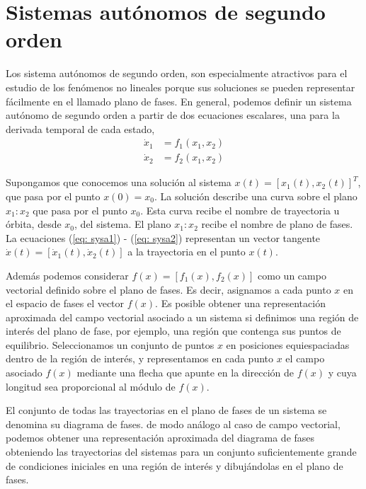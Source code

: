 \section{Sistemas autónomos de segundo orden}
Los sistema autónomos de segundo orden, son especialmente atractivos para el estudio de los fenómenos no lineales porque sus soluciones se pueden representar fácilmente en el llamado plano de fases.
En general, podemos definir un sistema autónomo de segundo orden a partir de dos ecuaciones escalares, una para la derivada temporal de cada estado,
\begin{align}
\dot x_1 &= f_1(x_1,x_2) \label{eq: sysa1}\\
\dot x_2 &= f_2(x_1,x_2) \label{eq: sysa2}
\end{align}

Supongamos que conocemos una solución al sistema $x(t) = [x_1(t),x_2(t)]^T$, que pasa por el punto $x(0) = x_0$. La solución describe una curva sobre el plano $x_1:x_2$ que pasa por el punto $x_0$. Esta curva recibe el nombre de trayectoria u órbita, desde $x_0$, del sistema. El plano $x_1:x_2$ recibe el nombre de plano de fases. La ecuaciones (\ref{eq: sysa1}) - (\ref{eq: sysa2}) representan un vector tangente $\dot x(t) = [\dot x_1(t),\dot x_2(t)]$ a la trayectoria en el punto $x(t)$.

Además podemos considerar $f(x)=[f_1(x),f_2(x)]$ como un campo vectorial definido sobre el plano de fases. Es decir, asignamos a cada punto $x$ en el espacio de fases el vector $f(x)$. Es posible obtener una representación aproximada del campo vectorial asociado a un sistema si definimos una región de interés del plano de fase, por ejemplo, una región que contenga sus puntos de equilibrio. Seleccionamos un conjunto de puntos $x$ en posiciones equiespaciadas dentro de la región de interés, y representamos en cada punto $x$ el campo asociado $f(x)$ mediante una flecha que apunte en la dirección de $f(x)$ y cuya longitud sea proporcional al módulo de $f(x)$.

El conjunto de todas las trayectorias en el plano de fases de un sistema se denomina su diagrama de fases. de modo análogo al caso de campo vectorial, podemos obtener una representación aproximada del diagrama de fases obteniendo las trayectorias del sistemas para un conjunto suficientemente grande de condiciones iniciales en una región de interés y dibujándolas en el plano de fases.

